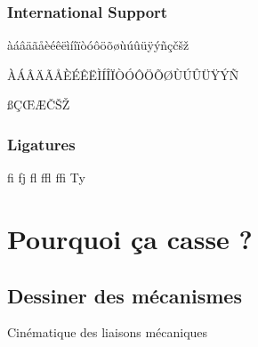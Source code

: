 \documentclass[
	11pt, %
	fleqn, %
	a4paper, %
]{LegrandOrangeBook}
\begin{document}

\section{International Support}

àáâäãåèéêëìíîïòóôöõøùúûüÿýñçčšž

\noindent ÀÁÂÄÃÅÈÉÊËÌÍÎÏÒÓÔÖÕØÙÚÛÜŸÝÑ

\noindent ßÇŒÆČŠŽ


\section{Ligatures}

fi fj fl ffl ffi Ty


\part{Pourquoi ça casse ?}


\chapter{Dessiner des mécanismes}
\begin{corollary}[S3.1.1]
Cinématique des liaisons mécaniques
\end{corollary}
\end{document}
